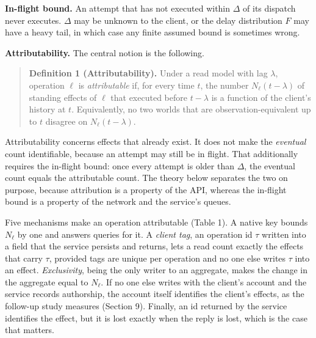 \documentclass[
  10pt,
]{article}
\begin{document}
\textbf{In-flight bound.} An attempt that has not executed within
\(\Delta\) of its dispatch never executes. \(\Delta\) may be unknown to
the client, or the delay distribution \(F\) may have a heavy tail, in
which case any finite assumed bound is sometimes wrong.

\textbf{Attributability.} The central notion is the following.

\begin{quote}
\textbf{Definition 1 (Attributability).} Under a read model with lag
\(\lambda\), operation \(\ell\) is \emph{attributable} if, for every
time \(t\), the number \(N_\ell(t-\lambda)\) of standing effects of
\(\ell\) that executed before \(t-\lambda\) is a function of the
client's history at \(t\). Equivalently, no two worlds that are
observation-equivalent up to \(t\) disagree on \(N_\ell(t-\lambda)\).
\end{quote}

Attributability concerns effects that already exist. It does not make
the \emph{eventual} count identifiable, because an attempt may still be
in flight. That additionally requires the in-flight bound: once every
attempt is older than \(\Delta\), the eventual count equals the
attributable count. The theory below separates the two on purpose,
because attribution is a property of the API, whereas the in-flight
bound is a property of the network and the service's queues.

Five mechanisms make an operation attributable (Table 1). A native key
bounds \(N_\ell\) by one and answers queries for it. A \emph{client
tag}, an operation id \(\tau\) written into a field that the service
persists and returns, lets a read count exactly the effects that carry
\(\tau\), provided tags are unique per operation and no one else writes
\(\tau\) into an effect. \emph{Exclusivity}, being the only writer to an
aggregate, makes the change in the aggregate equal to \(N_\ell\). If no
one else writes with the client's account and the service records
authorship, the account itself identifies the client's effects, as the
follow-up study measures (Section 9). Finally, an id returned by the
service identifies the effect, but it is lost exactly when the reply is
lost, which is the case that matters.
\end{document}
